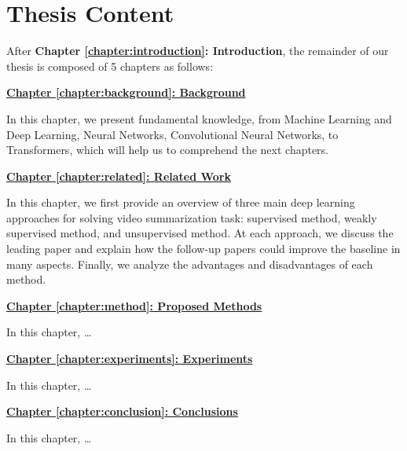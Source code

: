 \section{Thesis Content}
\label{section:intro-content}
After \textbf{Chapter \ref{chapter:introduction}: Introduction}, the remainder of our thesis is composed of 5 chapters as follows:

\hyperref[chapter:background]{\textbf{Chapter \ref{chapter:background}: Background}}


In this chapter, we present fundamental knowledge, from Machine Learning and Deep Learning, Neural Networks, Convolutional Neural Networks, to Transformers, which will help us to comprehend the next chapters.

\hyperref[chapter:related]{\textbf{Chapter \ref{chapter:related}: Related Work}}

In this chapter, we first provide an overview of three main deep learning approaches for solving video summarization task: supervised method, weakly supervised method, and unsupervised method. At each approach, we discuss the leading paper and explain how the follow-up papers could improve the baseline in many aspects. Finally, we analyze the advantages and disadvantages of each method. 

\hyperref[chapter:method]{\textbf{Chapter \ref{chapter:method}: Proposed Methods}}

In this chapter, \dots

\hyperref[chapter:experiments]{\textbf{Chapter \ref{chapter:experiments}: Experiments}}

In this chapter, \dots

\hyperref[chapter:conclusion]{\textbf{Chapter \ref{chapter:conclusion}: Conclusions}}

In this chapter, \dots




